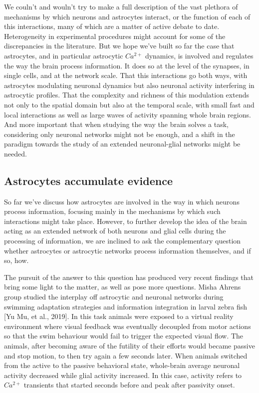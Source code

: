We couln't and wouln't try to make a full description of the vast plethora of mechanisms by which neurons and astrocytes interact, or the function of each of this interactions, many of which are a matter of active debate to date. 
Heterogeneity in experimental procedures might account for some of the discrepancies in the literature.
But we hope we've built so far the case that astrocytes, and in particular astrocytic $Ca^{2+}$ dynamics, is involved and regulates the way the brain process information.
It does so at the level of the synapses, in single cells, and at the network scale.
That this interactions go both ways, with astrocytes modulating neuronal dynamics but also neuronal activity interfering in astrocytic profiles.
That the complexity and richness of this modulation extends not only to the spatial domain but also at the temporal scale, with small fast and local interactions as well as large waves of activity spanning whole brain regions.
And more important that when studying the way the brain solves a task, considering only neuronal networks might not be enough, and a shift in the paradigm towards the study of an extended neuronal-glial networks might be needed. 

\subsection{Astrocytes accumulate evidence}
\label{chap1:sec:2:subsec4:astro_evidence}
So far we've discuss how astrocytes are involved in the way in which neurons process information, focusing mainly in the mechanisms by which such interactions might take place.
However, to further develop the idea of the brain acting as an extended network of both neurons and glial cells during the processing of information, we are inclined to ask the complementary question whether astrocytes or astrocytic networks process information themselves, and if so, how. 

The pursuit of the answer to this question has produced very recent findings that bring some light to the matter, as well as pose more questions. 
Misha Ahrens group studied the interplay off astrocytic and neuronal networks during swimming adaptation strategies and information integration in larval zebra fish [Yu Mu, et al., 2019]. 
In this task animals were exposed to a virtual reality environment where visual feedback was eventually decoupled from motor actions so that the swim behaviour would fail to trigger the expected visual flow. 
The animals, after becoming aware of the futility of their efforts would became passive and stop motion, to then try again a few seconds later. 
When animals switched from the active to the passive behavioral state, whole-brain average neuronal activity decreased while glial activity increased. 
In this case, activity refers to $Ca^{2+}$ transients that started seconds before and peak after passivity onset. 

